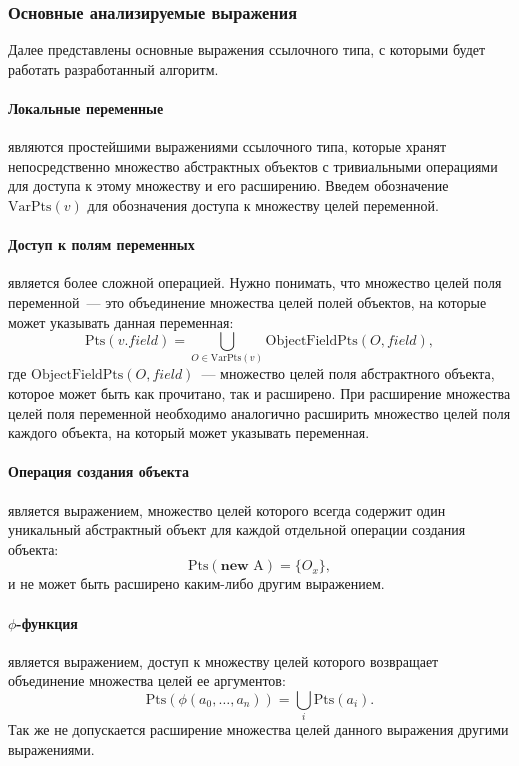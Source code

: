 \documentclass[14pt,titlepage]{extarticle}
\newcommand{\NEW}{\textbf{new }}
\newcommand{\Pts}[1]{\textrm{Pts}(#1)}
\newcommand{\VPts}[1]{\textrm{VarPts}(#1)}
\newcommand{\OFPts}[2]{\textrm{ObjectFieldPts}(#1, #2)}
\begin{document}
      \subsubsection{Основные анализируемые выражения}

      Далее представлены основные выражения ссылочного типа, с которыми будет
      работать разработанный алгоритм.

      \paragraph{Локальные переменные} являются простейшими выражениями
      ссылочного типа, которые хранят непосредственно множество абстрактных
      объектов с тривиальными операциями для доступа к этому множеству и его
      расширению. Введем обозначение $\VPts{v}$ для обозначения доступа к
      множеству целей переменной.

      \paragraph{Доступ к полям переменных} является более сложной операцией.
      Нужно понимать, что множество целей поля переменной~--- это объединение
      множества целей полей объектов, на которые может указывать данная
      переменная:
      \[\Pts{v.field} = \bigcup\limits_{O \in \VPts{v}} \OFPts{O}{field},\]
      где $\OFPts{O}{field}$~--- множество целей поля абстрактного объекта,
      которое может быть как прочитано, так и расширено.
      При расширение множества целей поля переменной необходимо аналогично
      расширить множество целей поля каждого объекта, на который может
      указывать переменная.

      \paragraph{Операция создания объекта} является выражением, множество
      целей которого всегда содержит один уникальный абстрактный объект для
      каждой отдельной операции создания объекта:
      \[\Pts{\NEW \textrm{A}} = \{O_x\},\]
      и не может быть расширено каким-либо другим выражением.

      \paragraph{$\phi$-функция} является выражением, доступ к множеству целей
      которого возвращает объединение множества целей ее аргументов:
      \[\Pts{\phi(a_0, \ldots, a_n)} = \bigcup\limits_{i} \Pts{a_i}.\]
      Так же не допускается расширение множества целей данного выражения
      другими выражениями.
\end{document}
